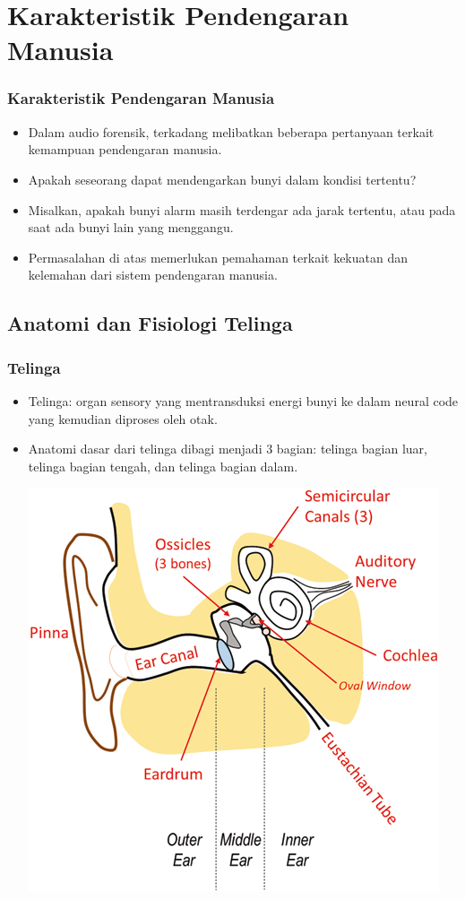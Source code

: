 \documentclass[pdflatex,compress]{beamer}
\begin{document}
\section{Karakteristik Pendengaran Manusia}

\begin{frame}
	\frametitle{Karakteristik Pendengaran Manusia}
	\begin{itemize}
		\item Dalam audio forensik, terkadang melibatkan beberapa pertanyaan terkait kemampuan pendengaran manusia.
		\item Apakah seseorang dapat mendengarkan bunyi dalam kondisi tertentu?
		\item Misalkan, apakah bunyi alarm masih terdengar ada jarak tertentu, atau pada saat ada bunyi lain yang menggangu.
		\item Permasalahan di atas memerlukan pemahaman terkait kekuatan dan kelemahan dari sistem pendengaran manusia.
	\end{itemize}
\end{frame}

\subsection{Anatomi dan Fisiologi Telinga}

\begin{frame}
	\frametitle{Telinga}
	\begin{itemize}
		\item Telinga: organ sensory yang mentransduksi energi bunyi ke dalam neural code yang kemudian diproses oleh otak.
		\item Anatomi dasar dari telinga dibagi menjadi 3 bagian: telinga bagian luar, telinga bagian tengah, dan telinga bagian dalam.
		\begin{center}
			\includegraphics[width=0.5\linewidth]{img/img015}
		\end{center}
	\end{itemize}
\end{frame}
\end{document}
